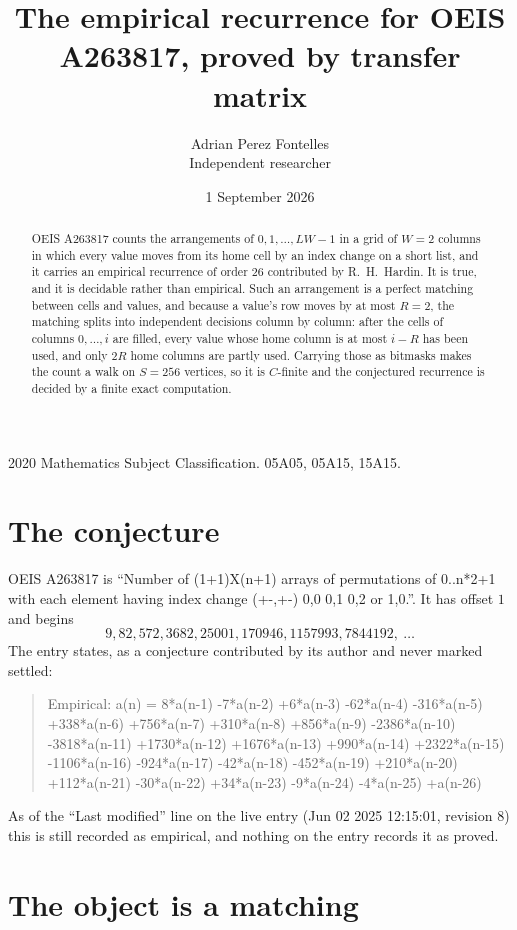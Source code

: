\documentclass[11pt,a4paper]{article}
\title{The empirical recurrence for OEIS A263817, proved by transfer matrix}
\author{Adrian Perez Fontelles\\ \small Independent researcher}
\date{1 September 2026}
\theoremstyle{plain}
\theoremstyle{definition}
\begin{document}
\maketitle

\begin{abstract}
OEIS A263817 counts the arrangements of $0,1,\dots,LW-1$ in a grid of $W=2$ columns in which
every value moves from its home cell by an index change on a short list, and it carries an
empirical recurrence of order $26$ contributed by R.~H.~Hardin. It is true, and it is
decidable rather than empirical. Such an arrangement is a perfect matching between cells and
values, and because a value's row moves by at most $R=2$, the matching splits into
independent decisions column by column: after the cells of columns $0,\dots,i$ are filled,
every value whose home column is at most $i-R$ has been used, and only $2R$ home columns are
partly used. Carrying those as bitmasks makes the count a walk on $S=256$ vertices, so it is
$C$-finite and the conjectured recurrence is decided by a finite exact computation.
\end{abstract}

\noindent\small 2020 Mathematics Subject Classification. 05A05, 05A15, 15A15.\normalsize

\section{The conjecture}

OEIS A263817 is ``Number of (1+1)X(n+1) arrays of permutations of 0..n*2+1 with each element having index change (+-,+-) 0,0 0,1 0,2 or 1,0.''. It has offset $1$ and begins
\[
9, 82, 572, 3682, 25001, 170946, 1157993, 7844192,\ \dots
\]
The entry states, as a conjecture contributed by its author and never marked settled:
\begin{quote}
Empirical: a(n) = 8*a(n-1) -7*a(n-2) +6*a(n-3) -62*a(n-4) -316*a(n-5) +338*a(n-6) +756*a(n-7) +310*a(n-8) +856*a(n-9) -2386*a(n-10) -3818*a(n-11) +1730*a(n-12) +1676*a(n-13) +990*a(n-14) +2322*a(n-15) -1106*a(n-16) -924*a(n-17) -42*a(n-18) -452*a(n-19) +210*a(n-20) +112*a(n-21) -30*a(n-22) +34*a(n-23) -9*a(n-24) -4*a(n-25) +a(n-26)
\end{quote}
As of the ``Last modified'' line on the live entry (Jun 02 2025 12:15:01, revision 8) this is still
recorded as empirical, and nothing on the entry records it as proved.

\section{The object is a matching}
\end{document}
